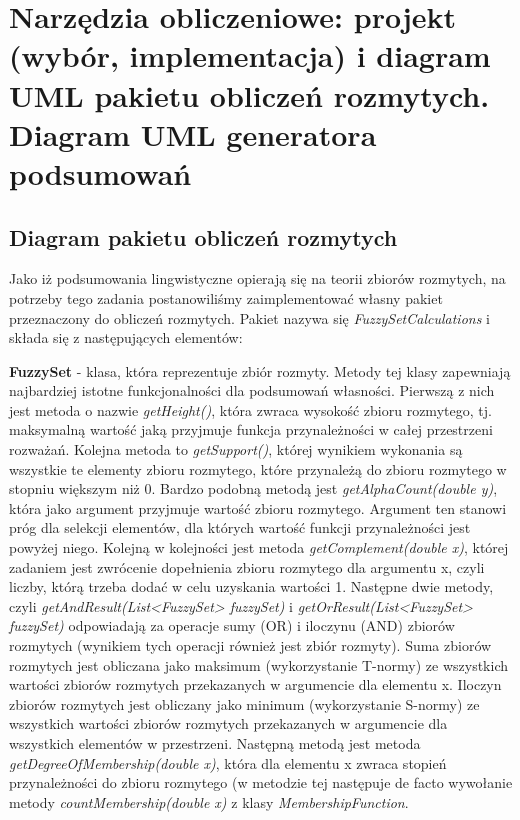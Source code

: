 \documentclass{classrep}
\begin{document}
\section{Narzędzia obliczeniowe: projekt (wybór, implementacja) i diagram UML pakietu obliczeń rozmytych. Diagram UML generatora podsumowań}
\subsection{Diagram pakietu obliczeń rozmytych}
Jako iż podsumowania lingwistyczne opierają się na teorii zbiorów rozmytych, na potrzeby tego zadania postanowiliśmy zaimplementować własny pakiet przeznaczony do obliczeń rozmytych. Pakiet nazywa się \textit{FuzzySetCalculations} i składa się z następujących elementów:

{\bf FuzzySet} - klasa, która reprezentuje zbiór rozmyty. 
Metody tej klasy zapewniają najbardziej istotne funkcjonalności dla podsumowań własności. 
Pierwszą z nich jest metoda o nazwie \textit{getHeight()}, która zwraca wysokość zbioru rozmytego, tj. maksymalną wartość jaką przyjmuje funkcja przynależności w całej przestrzeni rozważań.
Kolejna metoda to \textit{getSupport()}, której wynikiem wykonania są wszystkie te elementy zbioru rozmytego, które przynależą do zbioru rozmytego w stopniu większym niż 0. Bardzo podobną metodą jest \textit{getAlphaCount(double y)}, która jako argument przyjmuje wartość zbioru rozmytego. Argument ten stanowi próg dla selekcji elementów, dla których wartość funkcji przynależności jest powyżej niego. Kolejną w kolejności jest metoda \textit{getComplement(double x)}, której zadaniem jest zwrócenie dopełnienia zbioru rozmytego dla argumentu x, czyli liczby, którą trzeba dodać w celu uzyskania wartości 1. Następne dwie metody, czyli \textit{getAndResult(List<FuzzySet> fuzzySet)} i \textit{getOrResult(List<FuzzySet> fuzzySet)} odpowiadają za operacje sumy (OR) i iloczynu (AND) zbiorów rozmytych (wynikiem tych operacji również jest zbiór rozmyty). Suma zbiorów rozmytych jest obliczana jako maksimum (wykorzystanie T-normy) ze wszystkich wartości zbiorów rozmytych przekazanych w argumencie dla elementu x. Iloczyn zbiorów rozmytych jest obliczany jako minimum (wykorzystanie S-normy) ze wszystkich wartości zbiorów rozmytych przekazanych w argumencie dla wszystkich elementów w przestrzeni. Następną metodą jest metoda \textit{getDegreeOfMembership(double x)}, która dla elementu x zwraca stopień przynależności do zbioru rozmytego (w metodzie tej następuje de facto wywołanie metody \textit{countMembership(double x)} z klasy \textit{MembershipFunction}.
\end{document}
